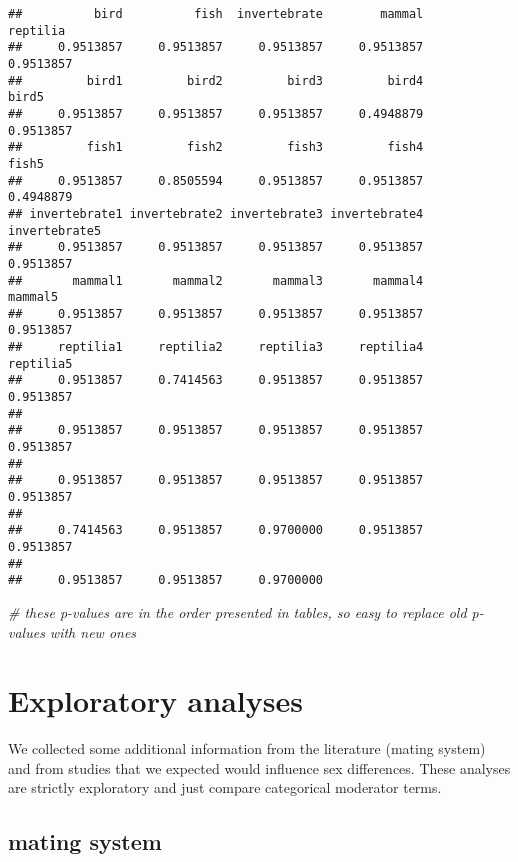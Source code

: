 \documentclass[]{article}
\newenvironment{Shaded}{\begin{snugshade}}{\end{snugshade}}
\newcommand{\CommentTok}[1]{\textcolor[rgb]{0.56,0.35,0.01}{\textit{#1}}}
\begin{document}
\begin{verbatim}
##          bird          fish  invertebrate        mammal      reptilia 
##     0.9513857     0.9513857     0.9513857     0.9513857     0.9513857 
##         bird1         bird2         bird3         bird4         bird5 
##     0.9513857     0.9513857     0.9513857     0.4948879     0.9513857 
##         fish1         fish2         fish3         fish4         fish5 
##     0.9513857     0.8505594     0.9513857     0.9513857     0.4948879 
## invertebrate1 invertebrate2 invertebrate3 invertebrate4 invertebrate5 
##     0.9513857     0.9513857     0.9513857     0.9513857     0.9513857 
##       mammal1       mammal2       mammal3       mammal4       mammal5 
##     0.9513857     0.9513857     0.9513857     0.9513857     0.9513857 
##     reptilia1     reptilia2     reptilia3     reptilia4     reptilia5 
##     0.9513857     0.7414563     0.9513857     0.9513857     0.9513857 
##                                                                       
##     0.9513857     0.9513857     0.9513857     0.9513857     0.9513857 
##                                                                       
##     0.9513857     0.9513857     0.9513857     0.9513857     0.9513857 
##                                                                       
##     0.7414563     0.9513857     0.9700000     0.9513857     0.9513857 
##                                           
##     0.9513857     0.9513857     0.9700000
\end{verbatim}

\begin{Shaded}
\begin{Highlighting}[]
  \CommentTok{# these p-values are in the order presented in tables, so easy to replace old p-values with new ones}
\end{Highlighting}
\end{Shaded}

\section{Exploratory analyses}\label{exploratory-analyses}

We collected some additional information from the literature (mating
system) and from studies that we expected would influence sex
differences. These analyses are strictly exploratory and just compare
categorical moderator terms.

\subsection{mating system}\label{mating-system}
\end{document}
